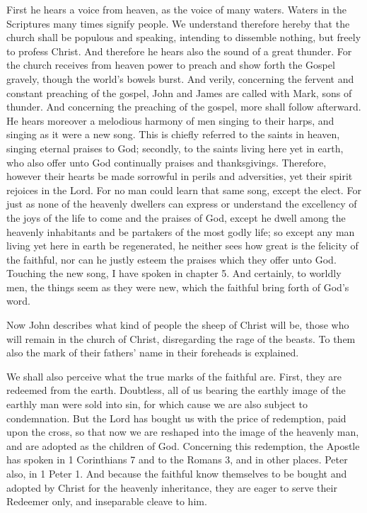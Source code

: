 First he hears a voice from heaven, as the voice of many waters. Waters in the Scriptures many times signify people. We understand therefore hereby that the church shall be populous and speaking, intending to dissemble nothing, but freely to profess Christ. And therefore he hears also the sound of a great thunder. For the church receives from heaven power to preach and show forth the Gospel gravely, though the world’s bowels burst. And verily, concerning the fervent and constant preaching of the gospel, John and James are called with Mark, sons of thunder. And concerning the preaching of the gospel, more shall follow afterward. He hears moreover a melodious harmony of men singing to their harps, and singing as it were a new song. This is chiefly referred to the saints in heaven, singing eternal praises to God; secondly, to the saints living here yet in earth, who also offer unto God continually praises and thanksgivings. Therefore, however their hearts be made sorrowful in perils and adversities, yet their spirit rejoices in the Lord. For no man could learn that same song, except the elect. For just as none of the heavenly dwellers can express or understand the excellency of the joys of the life to come and the praises of God, except he dwell among the heavenly inhabitants and be partakers of the most godly life; so except any man living yet here in earth be regenerated, he neither sees how great is the felicity of the faithful, nor can he justly esteem the praises which they offer unto God. Touching the new song, I have spoken in chapter 5. And certainly, to worldly men, the things seem as they were new, which the faithful bring forth of God’s word.

Now John describes what kind of people the sheep of Christ will be, those who will remain in the church of Christ, disregarding the rage of the beasts. To them also the mark of their fathers’ name in their foreheads is explained.

We shall also perceive what the true marks of the faithful are. First, they are redeemed from the earth. Doubtless, all of us bearing the earthly image of the earthly man were sold into sin, for which cause we are also subject to condemnation. But the Lord has bought us with the price of redemption, paid upon the cross, so that now we are reshaped into the image of the heavenly man, and are adopted as the children of God. Concerning this redemption, the Apostle has spoken in 1 Corinthians 7 and to the Romans 3, and in other places. Peter also, in 1 Peter 1. And because the faithful know themselves to be bought and adopted by Christ for the heavenly inheritance, they are eager to serve their Redeemer only, and inseparable cleave to him.

